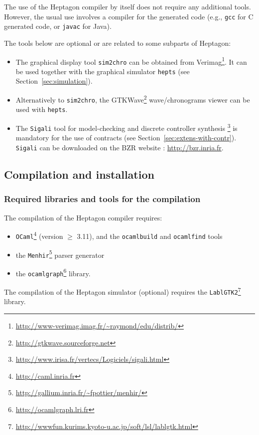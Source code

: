 \documentclass[a4paper]{article}
\begin{document}
The use of the Heptagon compiler by itself does not require any additional
tools. However, the usual use involves a compiler for the generated code (e.g.,
\texttt{gcc} for C generated code, or \texttt{javac} for Java).

The tools below are optional or are related to some subparts of Heptagon:
\begin{itemize}
\item The graphical display tool \texttt{sim2chro} can be obtained from
Verimag\footnote{\url{http://www-verimag.imag.fr/~raymond/edu/distrib/}}. It can
be used together with the graphical simulator \texttt{hepts} (see Section~\ref{sec:simulation}).
\item Alternatively to \texttt{sim2chro}, the
  GTKWave\footnote{\url{http://gtkwave.sourceforge.net}} wave/chronograms viewer
  can be used with \texttt{hepts}.
\item The \texttt{Sigali} tool for model-checking and discrete controller
  synthesis \cite{sigali}
  \footnote{\url{http://www.irisa.fr/vertecs/Logiciels/sigali.html}} is
  mandatory for the use of contracts (see
  Section~\ref{sec:extens-with-contr}). \texttt{Sigali} can be downloaded on the
  BZR website : \url{http://bzr.inria.fr}.
\end{itemize}

\subsection{Compilation and installation}
\label{sec:comp-inst}

\subsubsection{Required libraries and tools for the compilation}
\label{sec:requ-libr-tools}

The compilation of the Heptagon compiler requires:
\begin{itemize}
\item \texttt{OCaml}\footnote{\url{http://caml.inria.fr}} (version $\geq$
  3.11), and the \texttt{ocamlbuild} and \texttt{ocamlfind} tools
\item the \texttt{Menhir}\footnote{\url{http://gallium.inria.fr/~fpottier/menhir/}} parser generator
\item the \texttt{ocamlgraph}\footnote{\url{http://ocamlgraph.lri.fr}} library.
\end{itemize}

The compilation of the Heptagon simulator (optional) requires the
\texttt{LablGTK2}\footnote{\url{http://wwwfun.kurims.kyoto-u.ac.jp/soft/lsl/lablgtk.html}}
library.
\end{document}
